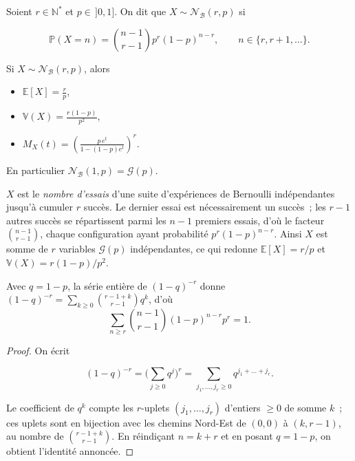 \begin{mdframed}
\begin{definition}
Soient $r\in\mathbb{N}^*$ et $p\in\,]0,1]$. On dit que $X\sim\mathcal{N_B}(r,p)$ si

$$
  \mathbb{P}(X=n)=\binom{n-1}{r-1}p^r(1-p)^{n-r},\qquad n\in\{r,r+1,\dots\}.
$$
\end{definition}
\end{mdframed}

\medskip

\begin{mdframed}
\begin{proposition}
Si $X\sim\mathcal{N_B}(r,p)$, alors

\begin{itemize}
\item $\mathbb{E}[X]=\frac rp$,
\item $\mathbb{V}(X)=\frac{r(1-p)}{p^2}$,
\item $M_X(t)=\left(\frac{p\,e^t}{1-(1-p)e^t}\right)^{\!r}$.
\end{itemize}

En particulier $\mathcal{N_B}(1,p)=\mathcal{G}(p)$.
\end{proposition}
\end{mdframed}

\begin{remarque}[Interprétation]
$X$ est le \emph{nombre d'essais} d'une suite d'expériences de Bernoulli indépendantes jusqu'à cumuler $r$ succès. Le dernier essai est nécessairement un succès~; les $r-1$ autres succès se répartissent parmi les $n-1$ premiers essais, d'où le facteur $\binom{n-1}{r-1}$, chaque configuration ayant probabilité $p^r(1-p)^{n-r}$. Ainsi $X$ est somme de $r$ variables $\mathcal{G}(p)$ indépendantes, ce qui redonne $\mathbb{E}[X]=r/p$ et $\mathbb{V}(X)=r(1-p)/p^2$.
\end{remarque}

\medskip

\begin{mdframed}
\begin{proposition}
Avec $q=1-p$, la série entière de $(1-q)^{-r}$ donne
$(1-q)^{-r}=\sum_{k\ge0}\binom{r-1+k}{r-1}q^k$, d'où
\[
  \sum_{n\ge r}\binom{n-1}{r-1}(1-p)^{n-r}p^r=1.
\]
\end{proposition}
\end{mdframed}

\begin{proof}
On écrit

$$(1-q)^{-r}=\big(\sum_{j\ge0}q^j\big)^r =\sum_{j_1,\dots,j_r\ge0}q^{j_1+\dots+j_r}. 
$$

Le coefficient de $q^k$ compte les $r$-uplets $(j_1,\dots,j_r)$ d'entiers $\ge0$ de somme $k$~; ces uplets sont en bijection avec les chemins Nord-Est de $(0,0)$ à $(k,r-1)$, au nombre de $\binom{r-1+k}{r-1}$. En réindiçant $n=k+r$ et en posant $q=1-p$, on obtient l'identité annoncée.
\end{proof}

